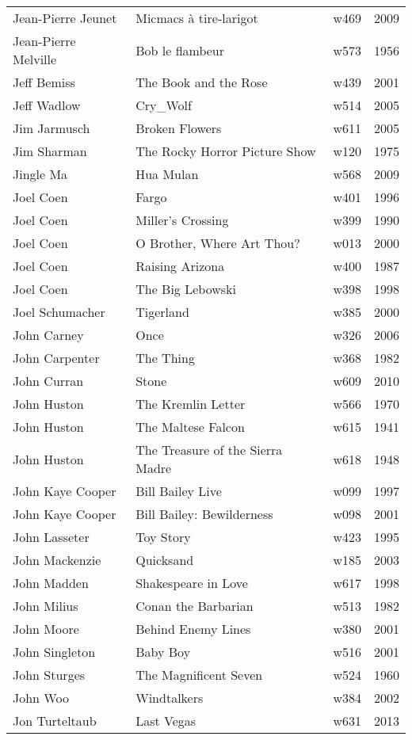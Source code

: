 \documentclass{article}
\begin{document}
\begin {center}
\begin{longtable}{l p{10cm} l l}
Jean-Pierre Jeunet & Micmacs à tire-larigot & w469 & 2009 \\
Jean-Pierre Melville & Bob le flambeur & w573 & 1956 \\
Jeff Bemiss & The Book and the Rose & w439 & 2001 \\
Jeff Wadlow & Cry\_Wolf & w514 & 2005 \\
Jim Jarmusch & Broken Flowers & w611 & 2005 \\
Jim Sharman & The Rocky Horror Picture Show & w120 & 1975 \\
Jingle Ma & Hua Mulan & w568 & 2009 \\
Joel Coen & Fargo & w401 & 1996 \\
Joel Coen & Miller's Crossing & w399 & 1990 \\
Joel Coen & O Brother, Where Art Thou? & w013 & 2000 \\
Joel Coen & Raising Arizona & w400 & 1987 \\
Joel Coen & The Big Lebowski & w398 & 1998 \\
Joel Schumacher & Tigerland & w385 & 2000 \\
John Carney & Once & w326 & 2006 \\
John Carpenter & The Thing & w368 & 1982 \\
John Curran & Stone & w609 & 2010 \\
John Huston & The Kremlin Letter & w566 & 1970 \\
John Huston & The Maltese Falcon & w615 & 1941 \\
John Huston & The Treasure of the Sierra Madre & w618 & 1948 \\
John Kaye Cooper & Bill Bailey Live & w099 & 1997 \\
John Kaye Cooper & Bill Bailey: Bewilderness & w098 & 2001 \\
John Lasseter & Toy Story & w423 & 1995 \\
John Mackenzie & Quicksand & w185 & 2003 \\
John Madden & Shakespeare in Love & w617 & 1998 \\
John Milius & Conan the Barbarian & w513 & 1982 \\
John Moore & Behind Enemy Lines & w380 & 2001 \\
John Singleton & Baby Boy & w516 & 2001 \\
John Sturges & The Magnificent Seven & w524 & 1960 \\
John Woo & Windtalkers & w384 & 2002 \\
Jon Turteltaub & Last Vegas & w631 & 2013 \\

\end{longtable}
\end{center}
\end{document}
